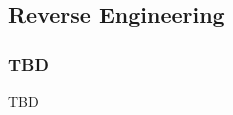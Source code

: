 
\subsection{Reverse Engineering}

\begin{frame}
\subsectionpage
\end{frame}

\subsubsection{TBD}

\begin{frame}{\subsubsecname}
TBD
\end{frame}


